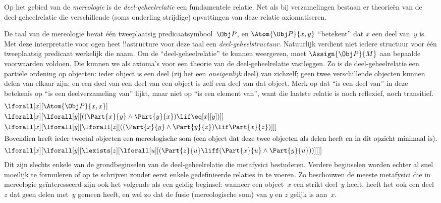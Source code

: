 \documentclass[../../../include/open-logic-section]{subfiles}
\begin{document}
\begin{ex}
Op het gebied van de \emph{mereologie} is de
\emph{deel-geheelrelatie} een fundamentele relatie. Net als bij
verzamelingen bestaan er theorieën van de deel-geheelrelatie die
verschillende (soms onderling strijdige) opvattingen van deze relatie
axiomatiseren.

De taal van de mereologie bevat één tweeplaatsig
predicaatsymbool~$\Obj P$, en $\Atom{\Obj P}{x, y}$ ``betekent'' dat
$x$ een deel van~$y$ is. Met deze interpretatie voor ogen heet
!!a{structure} voor deze taal een \emph{deel-geheelstructuur}.
Natuurlijk verdient niet iedere structuur voor één tweeplaatsig
predicaat werkelijk die naam. Om de ``deel-geheelrelatie'' te kunnen
weergeven, moet $\Assign{\Obj P}{M}$ aan bepaalde voorwaarden voldoen.
Die kunnen we als axioma's voor een theorie van de deel-geheelrelatie
vastleggen. Zo is de deel-geheelrelatie een partiële ordening op
objecten: ieder object is een deel (zij het een \emph{oneigenlijk}
deel) van zichzelf; geen twee verschillende objecten kunnen delen van
elkaar zijn; en een deel van een deel van een object is zelf een deel
van dat object. Merk op dat ``is een deel van'' in deze betekenis op
``is een deelverzameling van'' lijkt, maar niet op ``is een element
van'', want die laatste relatie is noch reflexief, noch transitief.
\begin{align*}
& \lforall[x][\Atom{\Obj P}{x,x}] \\
& \lforall[x][\lforall[y][((\Part{x}{y} \land \Part{y}{x})
      \lif \eq[x][y])]] \\
& \lforall[x][\lforall[y][\lforall[z][((\Part{x}{y} \land
        \Part{y}{z}) \lif \Part{x}{z})]]]\\
\intertext{Bovendien heeft ieder tweetal objecten een mereologische som (een object
  dat deze twee objecten als delen heeft en in dit opzicht minimaal is).}  &
\lforall[x][\lforall[y][\lexists[z][\lforall[u][(\Part{z}{u} \liff
        (\Part{x}{u} \land \Part{y}{u}))]]]]
\end{align*}
Dit zijn slechts enkele van de grondbeginselen van de
deel-geheelrelatie die metafysici bestuderen. Verdere beginselen worden
echter al snel moeilijk te formuleren of op te schrijven zonder eerst
enkele gedefinieerde relaties in te voeren. Zo beschouwen de meeste
metafysici die in mereologie geïnteresseerd zijn ook het volgende als
een geldig beginsel: wanneer een object~$x$ een strikt deel~$y$ heeft,
heeft het ook een deel~$z$ dat geen delen met~$y$ gemeen heeft, en wel
zo dat de fusie (mereologische som) van $y$ en $z$ gelijk is aan~$x$.
\end{ex}
\end{document}
